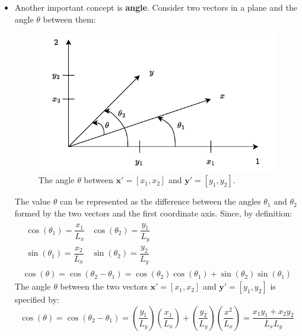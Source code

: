 \documentclass[a4paper]{article}
\newcommand{\definition}[1]{\textcolor{Red3}{\textbf{#1}}\index{#1}}
\begin{document}
\begin{itemize}
        \item Another important concept is \definition{angle}. Consider two vectors in a plane and the angle $\theta$ between them:
        \begin{figure}[!htp]
            \centering
            \includegraphics[width=.7\textwidth]{img/basics-vector-algebra-1.pdf}
            \caption{The angle $\theta$ between $\mathbf{x}' = \left[x_{1}, x_{2}\right]$ and $\mathbf{y}' = \left[y_{1}, y_{2}\right]$.}
        \end{figure}
        The value $\theta$ can be represented as the difference between the angles $\theta_{1}$ and $\theta_{2}$ formed by the two vectors and the first coordinate axis. Since, by definition:
        \begin{gather*}
            \begin{array}{rcl}
                \cos\left(\theta_{1}\right) = \dfrac{x_{1}}{L_{x}} & \cos\left(\theta_{2}\right) = \dfrac{y_{1}}{L_{y}} \\ [1em]
                \sin\left(\theta_{1}\right) = \dfrac{x_{2}}{L_{x}} & \sin\left(\theta_{2}\right) = \dfrac{y_{2}}{L_{y}}
            \end{array} \\
            \cos\left(\theta\right) = \cos\left(\theta_{2} - \theta_{1}\right) = \cos\left(\theta_{2}\right) \cos\left(\theta_{1}\right) + \sin\left(\theta_{2}\right) \sin\left(\theta_{1}\right)
        \end{gather*}
        The angle $\theta$ between the two vectors $\mathbf{x}' = \left[x_{1}, x_{2}\right]$ and $\mathbf{y}' = \left[y_{1}, y_{2}\right]$ is specified by:
        \begin{equation}\label{eq: angle}
            \cos\left(\theta\right) = \cos\left(\theta_{2} - \theta_{1}\right) = 
            \left(\dfrac{y_{1}}{L_{y}}\right)\left(\dfrac{x_{1}}{L_{x}}\right) + \left(\dfrac{y_{2}}{L_{y}}\right)\left(\dfrac{x^{2}}{L_{x}}\right) =
            \dfrac{x_{1}y_{1} + x_{2}y_{2}}{L_{x}L_{y}}
        \end{equation}


\end{itemize}
\end{document}
